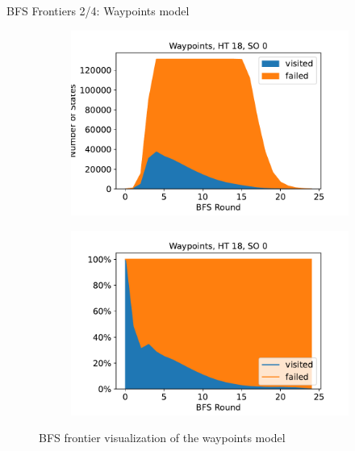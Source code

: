 \documentclass[aspectratio=169]{beamer}
\begin{document}
{%
\begin{frame}{BFS Frontiers 2/4: Waypoints model}
    \begin{figure}
        \begin{subfigure}[b]{.49\textwidth}
            \centering
            \includegraphics[width=\textwidth]{../../evaluation/output-assets/EXP-11-bfs-frontiers-1.pdf}
            \label{fig:evaluation:EXP-11:1}
        \end{subfigure}
        \begin{subfigure}[b]{.49\textwidth}
            \centering
            \includegraphics[width=\textwidth]{../../evaluation/output-assets/EXP-11-bfs-frontiers-5.pdf}
            \label{fig:evaluation:EXP-11:5}
        \end{subfigure}
        \caption{BFS frontier visualization of the waypoints model}
        \label{fig:evaluation:EXP-11-1}
    \end{figure}
\end{frame}

}
\end{document}
